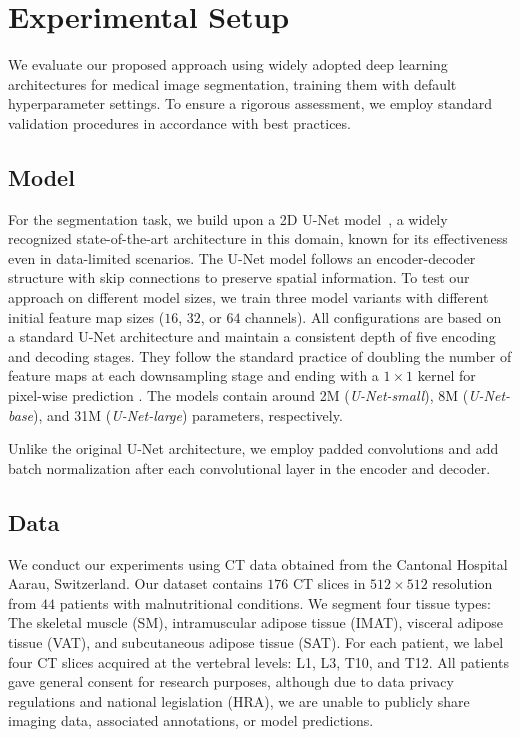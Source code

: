 \documentclass[conference]{IEEEtran}
\begin{document}
\section{Experimental Setup}

We evaluate our proposed approach using widely adopted deep learning architectures for medical image segmentation, training them with default hyperparameter settings. To ensure a rigorous assessment, we employ standard validation procedures in accordance with best practices.

\subsection{Model}
For the segmentation task, we build upon a 2D U-Net model~\cite{navab_u-net_2015}, a widely recognized state-of-the-art architecture in this domain, known for its effectiveness even in data-limited scenarios. The U-Net model follows an encoder-decoder structure with skip connections to preserve spatial information. To test our approach on different model sizes, we train three model variants with different initial feature map sizes ($16$, $32$, or $64$ channels). All configurations are based on a standard U-Net architecture and maintain a consistent depth of five encoding and decoding stages. They follow the standard practice of doubling the number of feature maps at each downsampling stage and ending with a $1\times1$ kernel for pixel-wise prediction \cite{navab_u-net_2015}. The models contain around 2M (\emph{U-Net-small}), 8M (\emph{U-Net-base}), and 31M (\emph{U-Net-large}) parameters, respectively.

Unlike the original U-Net architecture, we employ padded convolutions and add batch normalization after each convolutional layer in the encoder and decoder.

\subsection{Data}
We conduct our experiments using CT data obtained from the Cantonal Hospital Aarau, Switzerland. 
Our dataset contains $176$ CT slices in $512 \times 512$ resolution from $44$ patients with malnutritional conditions.
We segment four tissue types: The skeletal muscle (SM), intramuscular adipose tissue (IMAT), visceral adipose tissue (VAT), and subcutaneous adipose tissue (SAT).
For each patient, we label four CT slices acquired at the vertebral levels: L1, L3, T10, and T12.
All patients gave general consent for research purposes, although due to data privacy regulations and national legislation (HRA), we are unable to publicly share imaging data, associated annotations, or model predictions.
\end{document}
